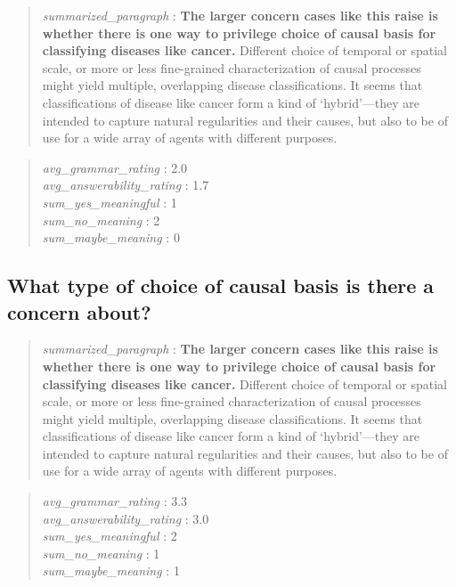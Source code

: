\begin{quote}
\emph{summarized\_paragraph} : \textbf{The larger concern cases like
this raise is whether there is one way to privilege choice of causal
basis for classifying diseases like cancer.} Different choice of
temporal or spatial scale, or more or less fine-grained characterization
of causal processes might yield multiple, overlapping disease
classifications. It seems that classifications of disease like cancer
form a kind of `hybrid'---they are intended to capture natural
regularities and their causes, but also to be of use for a wide array of
agents with different purposes.
\end{quote}

\begin{quote}
\emph{avg\_grammar\_rating} : 2.0\\
\emph{avg\_answerability\_rating} : 1.7\\
\emph{sum\_yes\_meaningful} : 1\\
\emph{sum\_no\_meaning} : 2\\
\emph{sum\_maybe\_meaning} : 0
\end{quote}

\hypertarget{what-type-of-choice-of-causal-basis-is-there-a-concern-about}{%
\subsection{What type of choice of causal basis is there a concern
about?}\label{what-type-of-choice-of-causal-basis-is-there-a-concern-about}}

\begin{quote}
\emph{summarized\_paragraph} : \textbf{The larger concern cases like
this raise is whether there is one way to privilege choice of causal
basis for classifying diseases like cancer.} Different choice of
temporal or spatial scale, or more or less fine-grained characterization
of causal processes might yield multiple, overlapping disease
classifications. It seems that classifications of disease like cancer
form a kind of `hybrid'---they are intended to capture natural
regularities and their causes, but also to be of use for a wide array of
agents with different purposes.
\end{quote}

\begin{quote}
\emph{avg\_grammar\_rating} : 3.3\\
\emph{avg\_answerability\_rating} : 3.0\\
\emph{sum\_yes\_meaningful} : 2\\
\emph{sum\_no\_meaning} : 1\\
\emph{sum\_maybe\_meaning} : 1
\end{quote}

